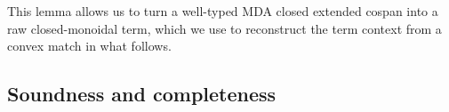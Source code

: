 This lemma allows us to turn a well-typed MDA closed extended cospan into a raw closed-monoidal term, which we use to reconstruct the term context from a convex match in what follows.

\subsection{Soundness and completeness}


